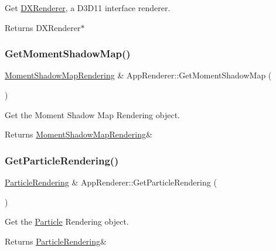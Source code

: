 Get \hyperlink{classDXRenderer}{D\+X\+Renderer}, a D3\+D11 interface renderer. 

\begin{DoxyReturn}{Returns}
D\+X\+Renderer$\ast$ 
\end{DoxyReturn}
\mbox{\label{classAppRenderer_af86218b9be6d10b9a5f39e89dc828d53}} 
\subsubsection{\texorpdfstring{Get\+Moment\+Shadow\+Map()}{GetMomentShadowMap()}}
{\footnotesize\ttfamily \hyperlink{classMomentShadowMapRendering}{Moment\+Shadow\+Map\+Rendering} \& App\+Renderer\+::\+Get\+Moment\+Shadow\+Map (\begin{DoxyParamCaption}{ }\end{DoxyParamCaption})}



Get the Moment Shadow Map Rendering object. 

\begin{DoxyReturn}{Returns}
\hyperlink{classMomentShadowMapRendering}{Moment\+Shadow\+Map\+Rendering}\& 
\end{DoxyReturn}
\mbox{\label{classAppRenderer_a0e5afe33f9a99df3c7b546710d20aa45}} 
\subsubsection{\texorpdfstring{Get\+Particle\+Rendering()}{GetParticleRendering()}}
{\footnotesize\ttfamily \hyperlink{classParticleRendering}{Particle\+Rendering} \& App\+Renderer\+::\+Get\+Particle\+Rendering (\begin{DoxyParamCaption}{ }\end{DoxyParamCaption})}



Get the \hyperlink{structParticle}{Particle} Rendering object. 

\begin{DoxyReturn}{Returns}
\hyperlink{classParticleRendering}{Particle\+Rendering}\& 
\end{DoxyReturn}
\mbox{\label{classAppRenderer_ae523d428966c527b385a65bae7bdb086}} 
